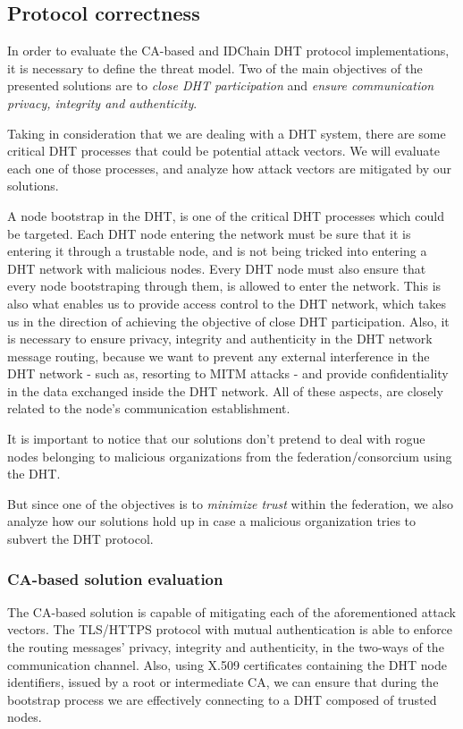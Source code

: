 \subsection{Protocol correctness}
\label{section:protocol-correcteness}

In order to evaluate the CA-based and IDChain DHT protocol implementations, it is necessary to define the threat model.
Two of the main objectives of the presented solutions are to \textit{close DHT participation} and \textit{ensure communication privacy, integrity and authenticity}.

Taking in consideration that we are dealing with a DHT system, there are some critical DHT processes that could be potential attack vectors.
We will evaluate each one of those processes, and analyze how attack vectors are mitigated by our solutions.

A node bootstrap in the DHT, is one of the critical DHT processes which could be targeted.
Each DHT node entering the network must be sure that it is entering it through a trustable node, and is not being tricked into entering a DHT network with malicious nodes.
Every DHT node must also ensure that every node bootstraping through them, is allowed to enter the network.
This is also what enables us to provide access control to the DHT network, which takes us in the direction of achieving the objective of close DHT participation.
Also, it is necessary to ensure privacy, integrity and authenticity in the DHT network message routing, because we want to prevent any external interference in the DHT network - such as, resorting to MITM attacks - and provide confidentiality in the data exchanged inside the DHT network.
All of these aspects, are closely related to the node's communication establishment.

It is important to notice that our solutions don't pretend to deal with rogue nodes belonging to malicious organizations from the federation/consorcium using the DHT.

But since one of the objectives is to \textit{minimize trust} within the federation, we also analyze how our solutions hold up in case a malicious organization tries to subvert the DHT protocol.

\subsubsection{CA-based solution evaluation}

The CA-based solution is capable of mitigating each of the aforementioned attack vectors.
The TLS/HTTPS protocol with mutual authentication is able to enforce the routing messages' privacy, integrity and authenticity, in the two-ways of the communication channel.
Also, using X.509 certificates containing the DHT node identifiers, issued by a root or intermediate CA, we can ensure that during the bootstrap process we are effectively connecting to a DHT composed of trusted nodes.

